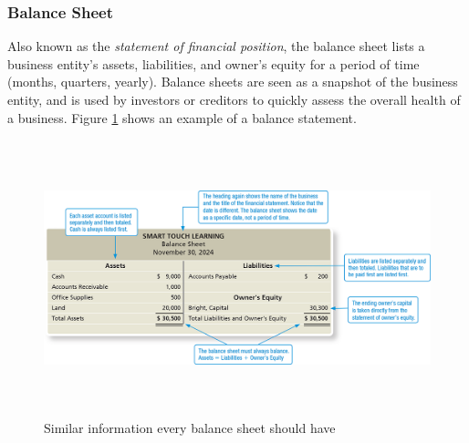 \documentclass[a4paper, 12pt]{article}
\begin{document}
\subsubsection{Balance Sheet}
Also known as the \emph{statement of financial position}, the balance sheet lists
a business entity's assets, liabilities, and owner's equity for a period of time
(months, quarters, yearly). Balance sheets are seen as a snapshot of the business
entity, and is used by investors or creditors to quickly assess the overall 
health of a business. Figure \ref{fig:balance_sheet} shows an example of a balance statement.
\begin{figure}[t]
    \centering
    \includegraphics[height=8.0cm, width=13.0cm]{balance_statement.png}
    \caption{Similar information every balance sheet should have}
    \label{fig:balance_sheet}
\end{figure}
\end{document}
